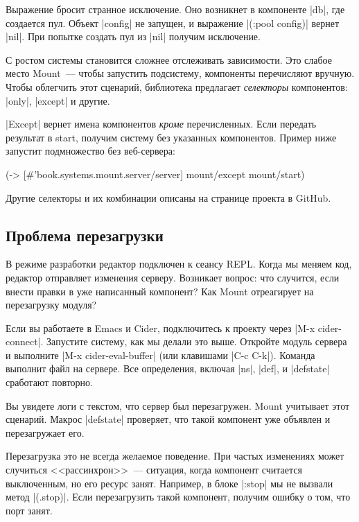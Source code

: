 Выражение бросит странное исключение. Оно возникнет в компоненте \spverb|db|,
где создается пул. Объект \spverb|config| не запущен, и выражение
\spverb|(:pool config)| вернет \spverb|nil|. При попытке создать пул из \spverb|nil| получим
исключение.

С ростом системы становится сложнее отслеживать зависимости. Это слабое место
Mount~--- чтобы запустить подсистему, компоненты перечисляют
вручную. Чтобы облегчить этот сценарий, библиотека предлагает \emph{селекторы}
компонентов: \spverb|only|, \spverb|except| и другие.

\spverb|Except| вернет имена компонентов \emph{кроме} перечисленных. Если
передать результат в start, получим систему без указанных компонентов. Пример
ниже запустит подмножество без веб-сервера:

\begin{english}
  \begin{clojure}
(-> [#'book.systems.mount.server/server]
    mount/except
    mount/start)
  \end{clojure}
\end{english}

Другие селекторы и их комбинации описаны на странице проекта в GitHub.

\subsection{Проблема перезагрузки}

В режиме разработки редактор подключен к сеансу REPL. Когда мы меняем код,
редактор отправляет изменения серверу. Возникает вопрос: что случится, если
внести правки в уже написанный компонент? Как Mount отреагирует на
перезагрузку модуля?

Если вы работаете в Emacs и Cider, подключитесь к проекту через
\spverb|M-x cider-connect|. Запустите систему, как мы делали это выше. Откройте модуль
сервера и выполните \spverb|M-x cider-eval-buffer| (или клавишами
\spverb|C-c C-k|). Команда выполнит файл на сервере. Все определения, включая \spverb|ns|,
\spverb|def|, и \spverb|defstate| сработают повторно.

Вы увидете логи с текстом, что сервер был перезагружен. Mount учитывает
этот сценарий. Макрос \spverb|defstate| проверяет, что такой компонент уже
объявлен и перезагружает его.

Перезагрузка это не всегда желаемое поведение. При частых изменениях может
случиться <<рассинхрон>>~--- ситуация, когда компонент считается выключенным, но
его ресурс занят. Например, в блоке \spverb|:stop| мы не вызвали метод
\spverb|(.stop)|. Если перезагрузить такой компонент, получим ошибку о том, что
порт занят.

